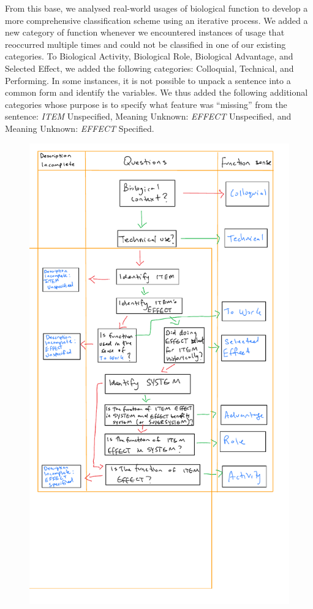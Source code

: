 \documentclass{article}
\begin{document}
From this base, we analysed real-world usages of biological function to develop a more comprehensive classification scheme using an iterative process.
We added a new category of function whenever we encountered instances of usage that reoccurred multiple times and could not be classified in one of our existing categories.
To Biological Activity, Biological Role, Biological Advantage, and Selected Effect, we added the following categories: Colloquial, Technical, and Performing.
In some instances, it is not possible to unpack a sentence into a common form and identify the variables.
We thus added the following additional categories whose purpose is to specify what feature was ``missing'' from the sentence: \emph{ITEM} Unspecified, Meaning Unknown: \emph{EFFECT} Unspecified, and Meaning Unknown: \emph{EFFECT} Specified.

\begin{figure}[ht]
  \centering
  \includegraphics[width=\linewidth]{GeneralFlowchart.pdf}
  \caption[\textbf{Decision flowchart for identifying sense of function.}]{}
  \label{flowchart}
\end{figure}
\end{document}
